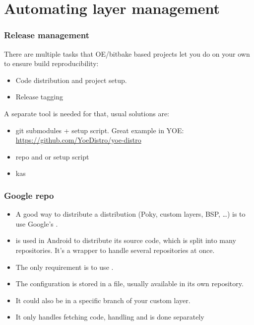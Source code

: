\section{Automating layer management}

\begin{frame}[fragile]
  \frametitle{Release management}
  There are multiple tasks that OE/bitbake based projects let you do
  on your own to ensure build reproducibility:
  \begin{itemize}
  \item Code distribution and project setup.
  \item Release tagging
  \end{itemize}
  A separate tool is needed for that, usual solutions are:
  \begin{itemize}
  \item git submodules + setup script. Great example in YOE:
    \url{https://github.com/YoeDistro/yoe-distro}
  \item repo and  or setup script
  \item kas
  \end{itemize}
\end{frame}

\begin{frame}
  \frametitle{Google repo}
  \begin{itemize}
    \item A good way to distribute a distribution (Poky, custom
      layers, BSP, \dots) is to use Google's
      .
    \item {} is used in Android to distribute its source
      code, which is split into many  repositories. It's a
      wrapper to handle several  repositories at once.
    \item The only requirement is to use .
    \item The  configuration is stored in a 
      file, usually available in its own  repository.
  \item It could also be in a specific branch of your custom layer.
  \item It only handles fetching code, handling  and
     is done separately
  \end{itemize}
\end{frame}

